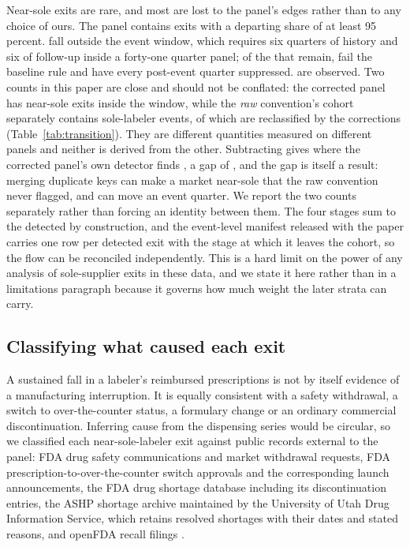 \documentclass[pdflatex,sn-vancouver-num,Numbered]{sn-jnl}
\begin{document}
Near-sole exits are rare, and most are lost to the panel's edges rather than to any choice of
ours. The panel contains \nFlowDetected exits with a departing share of at least 95 percent.
\nFlowOutsideUC fall outside the event window, which requires six quarters of history and six of
follow-up inside a forty-one quarter panel; of the \nFlowInWindow that remain, \nFlowFailedBaseW
fail the baseline rule and \nFlowSuppressed have every post-event quarter suppressed.
\nFlowObservedUC are observed. Two counts in this paper are close and should not be conflated:
the corrected panel has \nFlowInWindow near-sole exits inside the window, while the \emph{raw}
convention's cohort separately contains \nRawSole sole-labeler events, of which \nReclassSole are
reclassified by the corrections (Table~\ref{tab:transition}). They are different quantities
measured on different panels and neither is derived from the other. Subtracting gives
\nTransStillSole where the corrected panel's own detector finds \nTransSpecCSole, a gap of
\nTransGapW, and the gap is itself a result: merging duplicate keys can make a market near-sole
that the raw convention never flagged, and can move an event quarter. We report the two counts
separately rather than forcing an identity between them. The four stages sum to the \nFlowDetected detected by construction,
and the event-level manifest released with the paper carries one row per detected exit with the
stage at which it leaves the cohort, so the flow can be reconciled independently. This is a hard limit on the power of
any analysis of sole-supplier exits in these data, and we state it here rather than in a
limitations paragraph because it governs how much weight the later strata can carry.

\subsection{Classifying what caused each exit}\label{subsec:cause}

A sustained fall in a labeler's reimbursed prescriptions is not by itself evidence of a
manufacturing interruption. It is equally consistent with a safety withdrawal, a switch to
over-the-counter status, a formulary change or an ordinary commercial discontinuation. Inferring
cause from the dispensing series would be circular, so we classified each near-sole-labeler exit
against public records external to the panel: FDA drug safety communications and market
withdrawal requests, FDA prescription-to-over-the-counter switch approvals and the corresponding
launch announcements, the FDA drug shortage database \cite{fda_shortages} including its
discontinuation entries, the ASHP shortage archive maintained by the University of Utah Drug
Information Service, which retains resolved shortages with their dates and stated reasons, and
openFDA recall filings \cite{openfda}.
\end{document}
